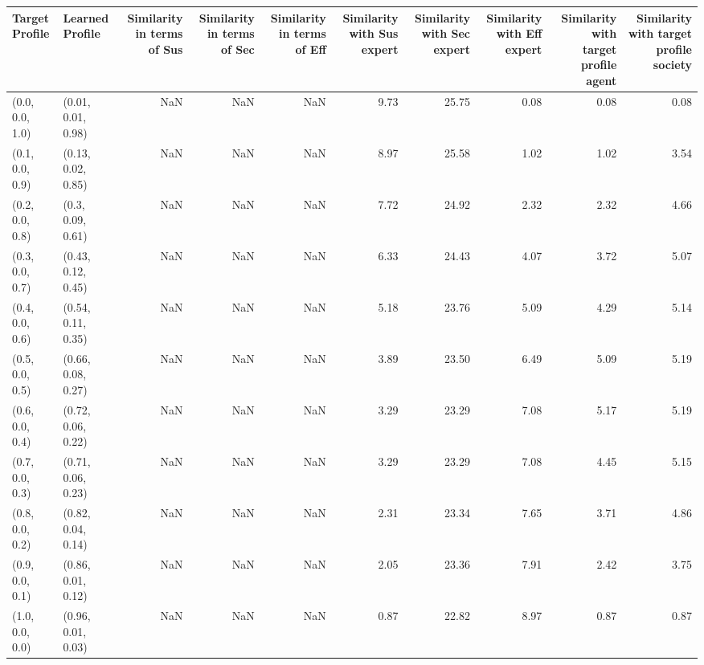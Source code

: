 \begin{tabular}{llrrrrrrrr}
\toprule
Target Profile & Learned Profile & Similarity in terms of Sus & Similarity in terms of Sec & Similarity in terms of Eff & Similarity with Sus expert & Similarity with Sec expert & Similarity with Eff expert & Similarity with target profile agent & Similarity with target profile society \\
\midrule
(0.0, 0.0, 1.0) & (0.01, 0.01, 0.98) & NaN & NaN & NaN & 9.73 & 25.75 & 0.08 & 0.08 & 0.08 \\
(0.1, 0.0, 0.9) & (0.13, 0.02, 0.85) & NaN & NaN & NaN & 8.97 & 25.58 & 1.02 & 1.02 & 3.54 \\
(0.2, 0.0, 0.8) & (0.3, 0.09, 0.61) & NaN & NaN & NaN & 7.72 & 24.92 & 2.32 & 2.32 & 4.66 \\
(0.3, 0.0, 0.7) & (0.43, 0.12, 0.45) & NaN & NaN & NaN & 6.33 & 24.43 & 4.07 & 3.72 & 5.07 \\
(0.4, 0.0, 0.6) & (0.54, 0.11, 0.35) & NaN & NaN & NaN & 5.18 & 23.76 & 5.09 & 4.29 & 5.14 \\
(0.5, 0.0, 0.5) & (0.66, 0.08, 0.27) & NaN & NaN & NaN & 3.89 & 23.50 & 6.49 & 5.09 & 5.19 \\
(0.6, 0.0, 0.4) & (0.72, 0.06, 0.22) & NaN & NaN & NaN & 3.29 & 23.29 & 7.08 & 5.17 & 5.19 \\
(0.7, 0.0, 0.3) & (0.71, 0.06, 0.23) & NaN & NaN & NaN & 3.29 & 23.29 & 7.08 & 4.45 & 5.15 \\
(0.8, 0.0, 0.2) & (0.82, 0.04, 0.14) & NaN & NaN & NaN & 2.31 & 23.34 & 7.65 & 3.71 & 4.86 \\
(0.9, 0.0, 0.1) & (0.86, 0.01, 0.12) & NaN & NaN & NaN & 2.05 & 23.36 & 7.91 & 2.42 & 3.75 \\
(1.0, 0.0, 0.0) & (0.96, 0.01, 0.03) & NaN & NaN & NaN & 0.87 & 22.82 & 8.97 & 0.87 & 0.87 \\
\bottomrule
\end{tabular}

